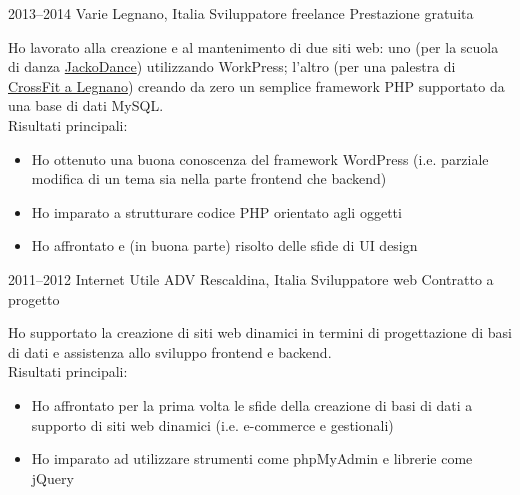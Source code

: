 \documentclass[print]{friggeri-custom} %
\begin{document}
\begin{entrylist}


\expentry
{2013--2014}
{Varie}
{Legnano, Italia}
{Sviluppatore freelance}
{Prestazione gratuita}
{Ho lavorato alla creazione e al mantenimento di due siti web: uno (per la scuola di danza \href{http://jackodance.it}{JackoDance}) utilizzando WorkPress; l'altro (per una palestra di \href{http://crossfitlegnano.com}{CrossFit a Legnano}) creando da zero un semplice framework PHP supportato da una base di dati MySQL. \\
Risultati principali:
\begin{itemize}
  \item Ho ottenuto una buona conoscenza del framework WordPress (i.e. parziale modifica di un tema sia nella parte frontend che backend)
  \item Ho imparato a strutturare codice PHP orientato agli oggetti
  \item Ho affrontato e (in buona parte) risolto delle sfide di UI design
\end{itemize}}


\expentry
{2011--2012}
{Internet Utile ADV}
{Rescaldina, Italia}
{Sviluppatore web}
{Contratto a progetto}
{Ho supportato la creazione di siti web dinamici in termini di progettazione di basi di dati e assistenza allo sviluppo frontend e backend. \\
Risultati principali:
\begin{itemize}
  \item Ho affrontato per la prima volta le sfide della creazione di basi di dati a supporto di siti web dinamici (i.e. e-commerce e gestionali)
  \item Ho imparato ad utilizzare strumenti come phpMyAdmin e librerie come jQuery
\end{itemize}}


\end{entrylist}
\end{document}
